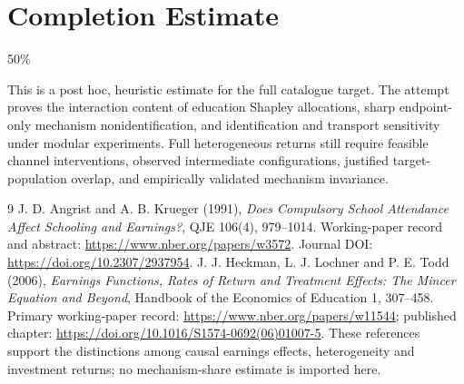 \documentclass[11pt,a4paper]{article}
\begin{document}
\section{Completion Estimate}
50\%

This is a post hoc, heuristic estimate for the full catalogue target.
The attempt proves the interaction content of education Shapley allocations, sharp endpoint-only mechanism nonidentification, and identification and transport sensitivity under modular experiments. Full heterogeneous returns still require feasible channel interventions, observed intermediate configurations, justified target-population overlap, and empirically validated mechanism invariance.

\begin{thebibliography}{9}
 J. D. Angrist and A. B. Krueger (1991), \emph{Does Compulsory School Attendance Affect Schooling and Earnings?}, QJE 106(4), 979--1014. Working-paper record and abstract: \url{https://www.nber.org/papers/w3572}. Journal DOI: \url{https://doi.org/10.2307/2937954}.
 J. J. Heckman, L. J. Lochner and P. E. Todd (2006), \emph{Earnings Functions, Rates of Return and Treatment Effects: The Mincer Equation and Beyond}, Handbook of the Economics of Education 1, 307--458. Primary working-paper record: \url{https://www.nber.org/papers/w11544}; published chapter: \url{https://doi.org/10.1016/S1574-0692(06)01007-5}. These references support the distinctions among causal earnings effects, heterogeneity and investment returns; no mechanism-share estimate is imported here.
\end{thebibliography}
\end{document}
